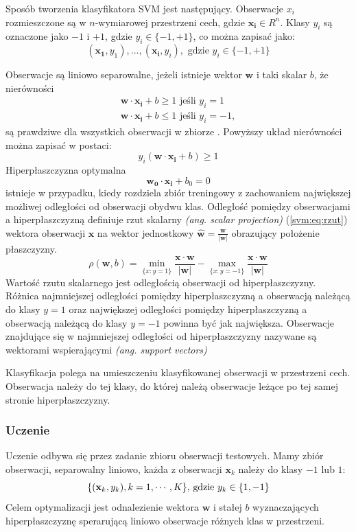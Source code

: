 \documentclass[a4paper,12pt,twoside,openany]{report}
\newcommand{\ang}[1]{\textit{(ang. #1)}}
\newcommand{\Eq}[1]{(\ref{#1})}
\renewcommand{\vec}[1]{\bm{#1}}
\begin{document}
Sposób tworzenia klasyfikatora SVM jest  następujący.
Obserwacje $x_i$ rozmieszczone są w $n$-wymiarowej przestrzeni cech, gdzie $\vec{x_i} \in R^n$.
Klasy $y_i$ są oznaczone jako $-1$ i $+1$, gdzie $y_i \in \{-1, +1\}$, co można zapisać jako:
\begin{equation}
	(\bm{x_1},y_1), ..., (\bm{x_i}, y_i), \textrm{ gdzie } y_i \in \{-1, +1\}
\end{equation}

Obserwacje są liniowo separowalne, jeżeli istnieje wektor $\bm{w}$ i taki skalar $b$, że nierówności
\begin{gather}
	\bm{w} \cdot \bm{x_i} + b \geq 1 \textrm{ jeśli } y_i = 1\\
	\bm{w} \cdot \bm{x_i} + b \leq 1 \textrm{ jeśli } y_i = -1,
\end{gather}
są prawdziwe dla wszystkich obserwacji w zbiorze \cite{Cortes1995}.
Powyższy układ nierówności można zapisać w postaci:
\begin{equation}
	y_i(\bm{w} \cdot \bm{x_i} + b) \geq 1
\end{equation}
Hiperpłaszczyzna optymalna 
\begin{equation}
	\bm{w_0} \cdot \bm{x_i}  + b_0 = 0
\end{equation}
istnieje w przypadku, kiedy rozdziela zbiór treningowy z zachowaniem największej możliwej odległości od obserwacji obydwu klas.
Odległość pomiędzy obserwacjami a hiperpłaszczyzną definiuje
rzut skalarny \ang{scalar projection} \Eq{svm:eq:rzut} wektora obserwacji $\bm{x}$ na wektor jednostkowy $\hat{\bm{w}} = \frac{\bm{w}}{|\bm{w}|}$
obrazujący położenie płaszczyzny.
\begin{equation}
	\rho(\bm{w}, b) = \min\limits_{\{x:y=1\}} \frac{\bm{x} \cdot \bm{w}} {|\bm{w}|} - \max\limits_{\{x:y=-1\}}  \frac{\bm{x} \cdot \bm{w}} {|\bm{w}|} 
	\label{svm:eq:rzut}
\end{equation}
Wartość rzutu skalarnego jest odległością obserwacji od hiperpłaszczyzny. 
Różnica najmniejszej odległości pomiędzy hiperpłaszczyzną a obserwacją należącą do klasy $y=1$
oraz największej odległości pomiędzy hiperpłaszczyzną a obserwacją należącą do klasy $y=-1$ 
powinna być jak największa.
Obserwacje znajdujące się w najmniejszej odległości od hiperpłaszczyzny nazywane są wektorami wspierającymi \ang{support vectors}

Klasyfikacja polega na umieszczeniu klasyfikowanej obserwacji w przestrzeni cech.
Obserwacja należy do tej klasy, do której należą obserwacje leżące po tej samej stronie hiperpłaszczyzny.
\subsubsection{Uczenie}
Uczenie odbywa się przez zadanie zbioru obserwacji testowych. 
Mamy zbiór obserwacji, separowalny liniowo, każda z obserwacji $\vec{x}_k$ należy do klasy $-1$ lub $1$:
\begin{equation}
	\{ ({\bf x}_k, y_k), k=1,\cdots,K \} \mbox{, gdzie } y_k \in \{1,-1\}
\end{equation}
Celem optymalizacji jest odnalezienie wektora $\vec{w}$ i stałej $b$ wyznaczających hiperpłaszczyznę
sperarującą liniowo obserwacje różnych klas w przestrzeni. 
\end{document}
